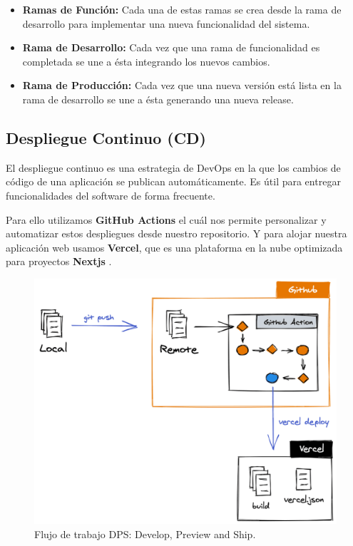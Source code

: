\documentclass[12pt,twoside,titlepage]{report}
\begin{document}
\begin{itemize}
    \item \textbf{Ramas de Función:} Cada una de estas ramas se crea desde la rama de desarrollo para implementar una nueva funcionalidad del sistema.
    \item \textbf{Rama de Desarrollo:} Cada vez que una rama de funcionalidad es completada se une a ésta integrando los nuevos cambios.
    \item \textbf{Rama de Producción:} Cada vez que una nueva versión está lista en la rama de desarrollo se une a ésta generando una nueva release.
\end{itemize}

\subsection{Despliegue Continuo (CD)}
\label{sec:dc}

El despliegue continuo es una estrategia de DevOps en la que los cambios de código de una aplicación se publican automáticamente. Es útil para entregar funcionalidades del software de forma frecuente.
\cite{dc}

Para ello utilizamos \textbf{GitHub Actions} \cite{githubActions} el cuál nos permite personalizar y automatizar estos despliegues desde nuestro repositorio. Y para alojar nuestra aplicación web usamos \textbf{Vercel}, que es una plataforma en la nube optimizada para proyectos \textbf{Nextjs} \cite{vercelNext}.

\begin{figure}[H]
    \centering
    \includegraphics[scale=0.3]{DevOps/DPS}
    \caption{Flujo de trabajo DPS: Develop, Preview and Ship.}
    \label{fig:vercel_workflow}
\end{figure}
\end{document}
